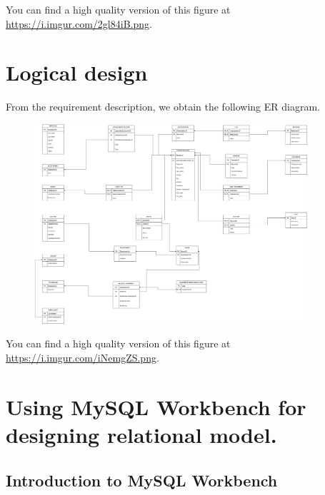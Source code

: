 \documentclass[a4paper]{article}
\numberwithin{equation}{section}
\begin{document}
You can find a high quality version of this figure at \url{https://i.imgur.com/2gl84iB.png}.

\newpage

\section{Logical design}
From the requirement description, we obtain the following ER diagram.

\begin{figure}[H]
  \centering
  \includegraphics[width=0.9\textwidth]{logical design.png}\label{Logical design}
\end{figure}

You can find a high quality version of this figure at \url{https://i.imgur.com/iNemgZS.png}.

\newpage



\section{Using MySQL Workbench for designing relational model.}
\subsection{Introduction to MySQL Workbench}

\end{document}
